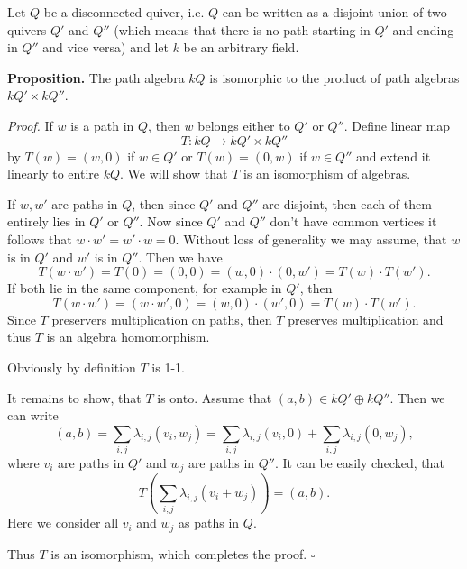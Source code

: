\documentclass[12pt]{article}
\begin{document}
Let $Q$ be a disconnected quiver, i.e. $Q$ can be written as a disjoint union of two quivers $Q'$ and $Q''$ (which means that there is no path starting in $Q'$ and ending in $Q''$ and vice versa) and let $k$ be an arbitrary field.

\textbf{Proposition.} The path algebra $kQ$ is isomorphic to the product of path algebras $kQ'\times kQ''$.

\textit{Proof.} If $w$ is a path in $Q$, then $w$ belongs either to $Q'$ or $Q''$. Define linear map 
$$T:kQ\to kQ'\times kQ''$$
by $T(w)=(w,0)$ if $w\in Q'$ or $T(w)=(0,w)$ if $w\in Q''$ and extend it linearly to entire $kQ$. We will show that $T$ is an isomorphism of algebras.

If $w,w'$ are paths in $Q$, then since $Q'$ and $Q''$ are disjoint, then each of them entirely lies in $Q'$ or $Q''$. Now since $Q'$ and $Q''$ don't have common vertices it follows that $w\cdot w'=w'\cdot w=0$. Without loss of generality we may assume, that $w$ is in $Q'$ and $w'$ is in $Q''$. Then we have
$$T(w\cdot w')=T(0)=(0,0)=(w,0)\cdot(0,w')=T(w)\cdot T(w').$$
If both lie in the same component, for example in $Q'$, then
$$T(w\cdot w')=(w\cdot w',0)=(w,0)\cdot(w',0)=T(w)\cdot T(w').$$
Since $T$ preservers multiplication on paths, then $T$ preserves multiplication and thus $T$ is an algebra homomorphism.

Obviously by definition $T$ is 1-1.

It remains to show, that $T$ is onto. Assume that $(a,b)\in kQ'\oplus kQ''$. Then we can write
$$(a,b)=\sum_{i,j}\lambda_{i,j}(v_i,w_j)=\sum_{i,j}\lambda_{i,j}(v_i,0) + \sum_{i,j}\lambda_{i,j}(0,w_j),$$
where $v_i$ are paths in $Q'$ and $w_j$ are paths in $Q''$. It can be easily checked, that
$$T\left(\sum_{i,j}\lambda_{i,j}(v_i + w_j)\right)=(a,b).$$
Here we consider all $v_i$ and $w_j$ as paths in $Q$.

Thus $T$ is an isomorphism, which completes the proof. $\square$
\end{document}

